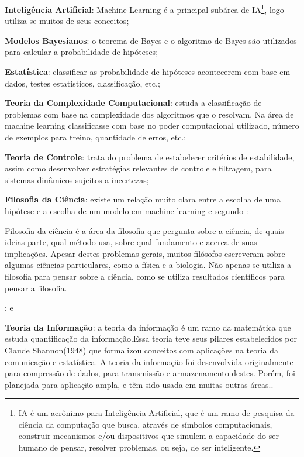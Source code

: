  \begin{alineascomponto}
	\item \textbf{Inteligência Artificial}: Machine Learning é a principal subárea de IA\footnote{IA é um acrônimo para Inteligência Artificial,
	 que é um ramo de pesquisa da ciência da computação que busca, através de símbolos computacionais, construir mecanismos 
	 e/ou dispositivos que simulem a capacidade do ser humano de pensar, resolver problemas, ou seja, de ser inteligente.\cite{IA_Web}},
	 logo utiliza-se muitos de seus conceitos;  
	\item \textbf{Modelos Bayesianos}: o teorema de Bayes e o algoritmo de Bayes são utilizados para calcular a probabilidade de hipóteses;
	\item \textbf{Estatística}: classificar as probabilidade de hipóteses acontecerem com base em dados, testes estatisticos, classificação, etc.;
	\item \textbf{Teoria da Complexidade Computacional}: estuda a classificação de problemas com base na complexidade dos algoritmos que
	o resolvam. Na área de machine learning classificasse com base no poder computacional utilizado, número de exemplos para treino, quantidade de erros, etc.;   
	\item \textbf{Teoria de Controle}: trata do problema de estabelecer critérios de estabilidade, assim como desenvolver estratégias 
	relevantes de controle e filtragem, para sistemas dinâmicos sujeitos a incertezas;
	\item \textbf{Filosofia da Ciência}: existe um relação muito clara entre a escolha de uma hipótese e a escolha de um modelo em machine learning 
	e segundo \cite{FilosofiaCiencia}: 	
	\begin{citacao} 
		Filosofia da ciência é a área da filosofia que pergunta sobre a ciência, de quais ideias parte, qual método usa, sobre qual fundamento e 
		acerca de suas implicações. Apesar destes problemas gerais, muitos filósofos escreveram sobre algumas ciências particulares, 
		como a física e a biologia. Não apenas se utiliza a filosofia para pensar sobre a ciência, 
		como se utiliza resultados científicos para pensar a filosofia.
	\end{citacao} 
	; e
	\item \textbf{Teoria da Informação}: a teoria da informação é um ramo da matemática que estuda quantificação da informação.Essa teoria teve seus 
	pilares estabelecidos por Claude Shannon(1948) que formalizou conceitos com aplicações na teoria da comunicação e estatística. 
	A teoria da informação foi desenvolvida originalmente para compressão de dados, para transmissão e armazenamento destes. 
	Porém, foi planejada para aplicação ampla, e têm sido usada em muitas outras áreas.\cite{TeoriaInformacao}.	
\end{alineascomponto}

